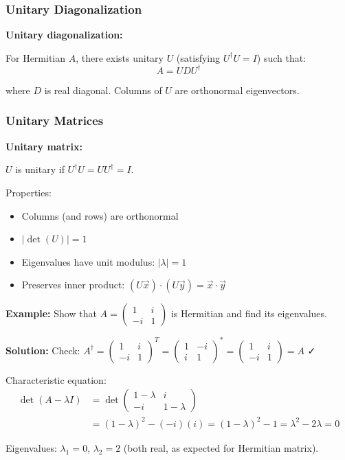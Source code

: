 \documentclass[12pt,a4paper]{article}
\begin{document}
\subsubsection{Unitary Diagonalization}
\begin{formulabox}
\textbf{Unitary diagonalization:}

For Hermitian $A$, there exists unitary $U$ (satisfying $U^\dagger U = I$) such that:
\begin{equation}
A = UDU^\dagger
\end{equation}

where $D$ is real diagonal. Columns of $U$ are orthonormal eigenvectors.
\end{formulabox}

\subsubsection{Unitary Matrices}
\begin{formulabox}
\textbf{Unitary matrix:}

$U$ is unitary if $U^\dagger U = UU^\dagger = I$.

Properties:
\begin{itemize}
    \item Columns (and rows) are orthonormal
    \item $|\det(U)| = 1$
    \item Eigenvalues have unit modulus: $|\lambda| = 1$
    \item Preserves inner product: $(U\vec{x}) \cdot (U\vec{y}) = \vec{x} \cdot \vec{y}$
\end{itemize}
\end{formulabox}

\begin{examplebox}
\textbf{Example:} Show that $A = \begin{pmatrix} 1 & i \\ -i & 1 \end{pmatrix}$ is Hermitian and find its eigenvalues.

\textbf{Solution:} Check: $A^\dagger = \begin{pmatrix} 1 & i \\ -i & 1 \end{pmatrix}^T = \begin{pmatrix} 1 & -i \\ i & 1 \end{pmatrix}^* = \begin{pmatrix} 1 & i \\ -i & 1 \end{pmatrix} = A$ ✓

Characteristic equation:
\begin{align}
\det(A - \lambda I) &= \det\begin{pmatrix} 1-\lambda & i \\ -i & 1-\lambda \end{pmatrix} \\
&= (1-\lambda)^2 - (-i)(i) = (1-\lambda)^2 - 1 = \lambda^2 - 2\lambda = 0
\end{align}

Eigenvalues: $\lambda_1 = 0$, $\lambda_2 = 2$ (both real, as expected for Hermitian matrix).
\end{examplebox}
\end{document}
